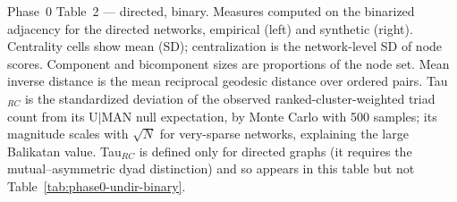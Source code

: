 \documentclass[11pt]{article}
\begin{document}
\begin{table}[!htbp]
\caption{Phase~0 Table~2 --- directed, binary. Measures computed on the binarized adjacency for the directed networks, empirical (left) and synthetic (right). Centrality cells show mean (SD); centralization is the network-level SD of node scores. Component and bicomponent sizes are proportions of the node set. Mean inverse distance is the mean reciprocal geodesic distance over ordered pairs. Tau$_{RC}$ is the standardized deviation of the observed ranked-cluster-weighted triad count from its U$\mid$MAN null expectation, by Monte Carlo with 500 samples; its magnitude scales with $\sqrt{N}$ for very-sparse networks, explaining the large Balikatan value. Tau$_{RC}$ is defined only for directed graphs (it requires the mutual--asymmetric dyad distinction) and so appears in this table but not Table~\ref{tab:phase0-undir-binary}.}
\label{tab:phase0-dir-binary}
\end{table}
\end{document}
